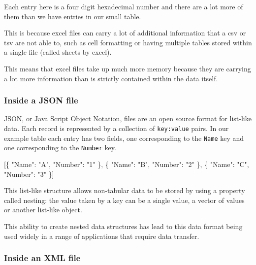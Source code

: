 \documentclass[
  letterpaper,
  DIV=11,
  numbers=noendperiod]{scrreprt}
\newenvironment{Shaded}{\begin{snugshade}}{\end{snugshade}}
\newcommand{\DataTypeTok}[1]{\textcolor[rgb]{0.68,0.00,0.00}{#1}}
\newcommand{\FunctionTok}[1]{\textcolor[rgb]{0.28,0.35,0.67}{#1}}
\newcommand{\OtherTok}[1]{\textcolor[rgb]{0.00,0.23,0.31}{#1}}
\newcommand{\StringTok}[1]{\textcolor[rgb]{0.13,0.47,0.30}{#1}}
\begin{document}
Each entry here is a four digit hexadecimal number and there are a lot
more of them than we have entries in our small table.

This is because excel files can carry a lot of additional information
that a csv or tsv are not able to, such as cell formatting or having
multiple tables stored within a single file (called sheets by excel).

This means that excel files take up much more memory because they are
carrying a lot more information than is strictly contained within the
data itself.

\subsubsection{Inside a JSON file}\label{inside-a-json-file}

JSON, or Java Script Object Notation, files are an open source format
for list-like data. Each record is represented by a collection of
\texttt{key:value} pairs. In our example table each entry has two
fields, one corresponding to the \texttt{Name} key and one corresponding
to the \texttt{Number} key.

\begin{Shaded}
\begin{Highlighting}[]
\OtherTok{[}\FunctionTok{\{}
    \DataTypeTok{"Name"}\FunctionTok{:} \StringTok{"A"}\FunctionTok{,}
    \DataTypeTok{"Number"}\FunctionTok{:} \StringTok{"1"}
\FunctionTok{\}}\OtherTok{,} \FunctionTok{\{}
    \DataTypeTok{"Name"}\FunctionTok{:} \StringTok{"B"}\FunctionTok{,}
    \DataTypeTok{"Number"}\FunctionTok{:} \StringTok{"2"}
\FunctionTok{\}}\OtherTok{,} \FunctionTok{\{}
    \DataTypeTok{"Name"}\FunctionTok{:} \StringTok{"C"}\FunctionTok{,}
    \DataTypeTok{"Number"}\FunctionTok{:} \StringTok{"3"}
\FunctionTok{\}}\OtherTok{]}
\end{Highlighting}
\end{Shaded}

This list-like structure allows non-tabular data to be stored by using a
property called nesting: the value taken by a key can be a single value,
a vector of values or another list-like object.

This ability to create nested data structures has lead to this data
format being used widely in a range of applications that require data
transfer.

\subsubsection{Inside an XML file}\label{inside-an-xml-file}
\end{document}
